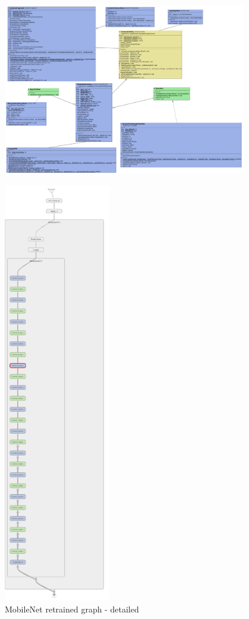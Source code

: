 \begin{figure}
\includegraphics[width=0.95\textwidth]{includes/ClassDiagram}
\end{figure}
\newpage


\begin{figure}[htbp]
\centering
\includegraphics[height=18.5cm]{includes/graphMobilenet050-700Layer}
\caption{MobileNet retrained graph - detailed}
\label{fig:MobileNet retrained graph - detailed}
\end{figure}
\newpage

